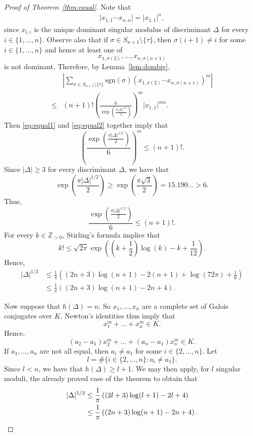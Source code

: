 \documentclass[11pt,a4paper, british]{amsart}
\theoremstyle{definition}
\theoremstyle{remark}
\numberwithin{equation}{section}
\newcommand{\Z}{\mathbb{Z}} %
\begin{document}
\begin{proof}[Proof of Theorem~\ref{thm:equal}]
	Note that
	\begin{align*}
		\lvert x_{1, 1} \cdots x_{n, n} \rvert = \lvert x_{1, 1} \rvert^n,
		\end{align*}
	since $x_{i, i}$ is the unique dominant singular modulus of discriminant $\Delta$ for every $i \in \{1, \ldots, n\}$. Observe also that if $\sigma \in S_{n+1} \setminus \{ \tau\}$, then $\sigma(i+1) \neq i$ for some $i \in \{1, \ldots, n\}$ and hence at least one of
	\[ x_{1, \sigma(2)}, \ldots, x_{n, \sigma(n+1)}\]
		is not dominant. Therefore, by Lemma~\ref{lem:dombig},
		\begin{align}\label{eq:equal2}
		&\left\lvert 	\sum_{\sigma \in S_{n+1} \setminus \{ \tau\}} \mathrm{sgn}(\sigma) (x_{1, \sigma(2)} \cdots x_{n, \sigma(n+1)})^m \right\rvert \nonumber\\ 
		\leq &(n+1)! \left(\frac{6   }{\exp\left(\frac{\pi \lvert \Delta \rvert^{1/2}}{2}\right) } \right)^m\lvert x_{1, 1} \rvert^{mn}.
			\end{align}
		Then \eqref{eq:equal1} and \eqref{eq:equal2} together imply that
		\[\left(\frac{\exp\left(\frac{\pi \lvert \Delta \rvert^{1/2}}{2}\right)}{6}\right)^m \leq  (n+1)!.\]
		Since $\lvert \Delta \rvert \geq 3$ for every discriminant $\Delta$, we have that
		\[ \exp\left(\frac{\pi \lvert \Delta \rvert^{1/2}}{2}\right) \geq \exp\left(\frac{\pi \sqrt{3}}{2}\right) = 15.190\ldots > 6.\]
		Thus,
			\[\frac{\exp\left(\frac{\pi \lvert \Delta \rvert^{1/2}}{2}\right)}{6} \leq  (n+1)!.\]
		For every $k \in \Z_{>0}$, Stirling's formula \cite[(1), (2)]{Robbins55} implies that
		\[ k! \leq \sqrt{2 \pi} \exp\left(\left(k+ \frac{1}{2}\right) \log\left(k\right) - k + \frac{1}{12}\right).\]
		Hence, 
		\begin{align*}
			 \lvert \Delta \rvert^{1/2} &\leq \frac{1}{\pi} \left((2n+3) \log(n+1) -2(n+1) +\log(72 \pi) + \frac{1}{6}\right)\\
			 &\leq \frac{1}{\pi} \left(\left(2n+3\right) \log\left(n+1\right) -2n +4\right).
			 \end{align*}
		
		Now suppose that $h(\Delta) = n$. So $x_1, \ldots, x_n$ are a complete set of Galois conjugates over $K$. Newton's identities thus imply that
		\[ x_1^m + \ldots + x_n^m \in K.\]
		Hence,
		\[ (a_2 - a_1) x_2^m + \ldots + (a_n - a_1) x_n^m \in K. \]
	If $a_1, \ldots, a_n$ are not all equal, then $a_i \neq a_1$ for some $i \in \{2, \ldots, n\}$. Let
	\[ l = \# \{i \in \{2, \ldots, n\} : a_i \neq a_1\}.\]
		Since $l < n$, we have that $h(\Delta) \geq l+1$. We may then apply, for $l$ singular moduli, the already proved case of the theorem to obtain that
		\begin{align*} 
			\lvert \Delta \rvert^{1/2} &\leq \frac{1}{\pi} \left((2l+3) \log(l+1) -2l +4\right)\\
			&\leq \frac{1}{\pi} \left((2n+3) \log(n+1) -2n +4\right).\qedhere
			\end{align*}
		\end{proof}
	
\end{document}
